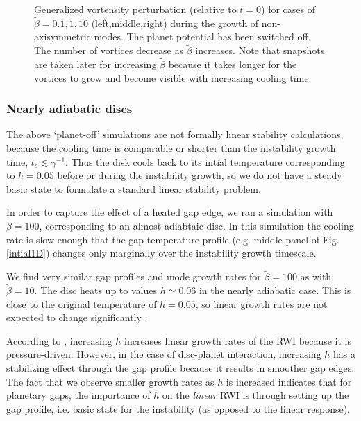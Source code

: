 \begin{figure}
{  }  
  \caption{Generalized vortensity perturbation (relative to $t=0$) for
    cases of $\tilde{\beta}=0.1,1,10$ (left,middle,right) during
    the growth of non-axisymmetric modes. The planet potential has
    been switched off.  The number of vortices
    decrease as $\tilde{\beta}$ increases. Note that snapshots are
    taken later for increasing $\tilde{\beta}$ because it takes longer
    for the vortices to grow and become visible with increasing cooling time. 
    \label{2Dlinear} 
  } 
\end{figure}

\subsubsection{Nearly adiabatic discs}
\label{adiabatic_section}

The above `planet-off' simulations are not formally linear
stability calculations, because the cooling time is comparable or shorter
than the instability growth time, $t_c\lesssim\gamma^{-1}$.  
Thus the disk cools back to its intial temperature corresponding to
$h=0.05$ before or during the instability growth, so we do not 
have a steady basic state to formulate a standard linear stability 
problem. 

In order to capture the effect of a heated gap edge, we ran a simulation with 
$\tilde{\beta}=100$, corresponding to an almost adiabtaic disc.  
In this simulation the cooling rate is slow enough that the gap 
temperature profile (e.g. middle panel of Fig. \ref{intial1D}) changes
only marginally over the instability growth timescale. 

We find very similar gap profiles and mode growth rates for
$\tilde{\beta}=100$ as with $\tilde{\beta}=10$. The disc heats up to
values $h\simeq0.06$ in the nearly adiabatic case. This is close to
the original temperature of $h=0.05$, so linear growth rates are not expected
to change significantly \citep{li00}. 

According to \cite{li00}, increasing $h$ increases linear growth rates
of the RWI because it is pressure-driven. However, in the case 
of disc-planet interaction, increasing $h$ has a stabilizing effect
through the gap profile because it results in smoother gap
edges. The fact that we observe smaller growth rates as $h$ is
increased indicates that for planetary gaps, the importance of $h$ on
the \emph{linear} RWI is through setting up the gap profile, i.e. basic
state for the instability (as opposed to the linear response). 

